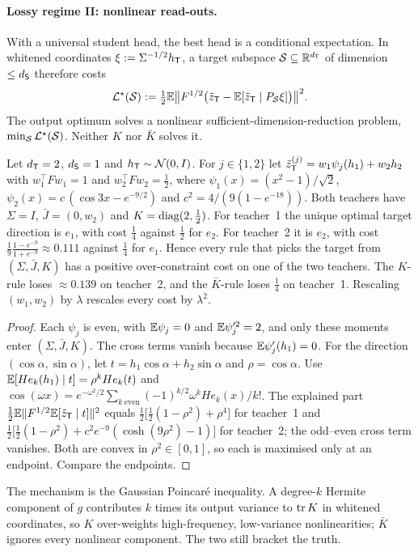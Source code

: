 \paragraph{Lossy regime II: nonlinear read-outs.}
With a universal student head, the best head is a conditional expectation. In whitened coordinates
$\xi:=\Sigma^{-1/2}h_{\mathsf{T}}$, a target subspace $\mathcal S\subseteq\mathbb{R}^{d_{\mathsf{T}}}$ of dimension $\le d_{\mathsf{S}}$ therefore costs
\[
\mathcal{L}^\star(\mathcal S):=\tfrac12\mathbb{E}\big\|F^{1/2}\big(\tilde z_{\mathsf{T}}-\mathbb{E}[\tilde z_{\mathsf{T}}\mid P_{\mathcal S}\xi]\big)\big\|^2 .
\]
The output optimum solves a nonlinear sufficient-dimension-reduction problem, $\min_{\mathcal S}\mathcal{L}^\star(\mathcal S)$. Neither
$K$ nor $\bar K$ solves it.

\begin{proposition}\label{prop:no-moment-rule}
\Mo\Ck Let $d_{\mathsf{T}}=2$, $d_{\mathsf{S}}=1$ and $h_{\mathsf{T}}\sim\mathcal{N}(0,I)$. For $j\in\{1,2\}$ let $\tilde z^{(j)}_{\mathsf{T}}=w_1\psi_j(h_1)+w_2h_2$ with
$w_1^\top Fw_1=1$ and $w_2^\top Fw_2=\frac12$, where $\psi_1(x)=(x^2-1)/\sqrt2$, $\psi_2(x)=c\,(\cos3x-e^{-9/2})$ and
$c^2=4/(9(1-e^{-18}))$. Both teachers have $\Sigma=I$, $\bar J=(0,w_2)$ and $K=\operatorname{diag}(2,\frac12)$. For teacher~1 the unique optimal
target direction is $e_1$, with cost $\frac14$ against $\frac12$ for $e_2$. For teacher~2 it is $e_2$, with cost
$\frac19\frac{1-e^{-9}}{1+e^{-9}}\approx0.111$ against $\frac14$ for $e_1$. Hence every rule that picks the target from
$(\Sigma,\bar J,K)$ has a positive over-constraint cost on one of the two teachers. The $K$-rule loses $\approx0.139$ on
teacher~2, and the $\bar K$-rule loses $\frac14$ on teacher~1. Rescaling $(w_1,w_2)$ by $\lambda$ rescales every cost by $\lambda^2$.
\end{proposition}
\begin{proof}
Each $\psi_j$ is even, with $\mathbb{E}\psi_j=0$ and $\mathbb{E}\psi_j'^2=2$, and only these moments enter $(\Sigma,\bar J,K)$. The cross terms
vanish because $\mathbb{E}\psi_j'(h_1)=0$. For the direction $(\cos\alpha,\sin\alpha)$, let $t=h_1\cos\alpha+h_2\sin\alpha$ and $\rho=\cos\alpha$. Use
$\mathbb{E}[He_k(h_1)\mid t]=\rho^kHe_k(t)$ and $\cos(\omega x)=e^{-\omega^2/2}\sum_{k\ \mathrm{even}}(-1)^{k/2}\omega^kHe_k(x)/k!$. The explained part
$\frac12\mathbb{E}\|F^{1/2}\mathbb{E}[\tilde z_{\mathsf{T}}\mid t]\|^2$ equals $\frac12\big[\frac12(1-\rho^2)+\rho^4\big]$ for teacher~1 and
$\frac12\big[\frac12(1-\rho^2)+c^2e^{-9}(\cosh(9\rho^2)-1)\big]$ for teacher~2; the odd--even cross term vanishes. Both are convex in
$\rho^2\in[0,1]$, so each is maximised only at an endpoint. Compare the endpoints.
\end{proof}
\noindent
The mechanism is the Gaussian Poincaré inequality. A degree-$k$ Hermite component of $g$ contributes $k$ times its output
variance to $\operatorname{tr} K$ in whitened coordinates, so $K$ over-weights high-frequency, low-variance nonlinearities; $\bar K$
ignores every nonlinear component. The two still bracket the truth.

